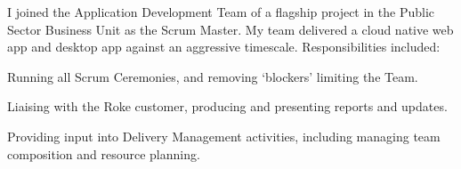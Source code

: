 I joined the Application Development Team of a flagship project in the Public Sector Business Unit as the Scrum Master.
My team delivered a cloud native web app and desktop app against an aggressive timescale.
Responsibilities included:
\vspace{0.25em}
\begin{tightemize}
  \item Running all Scrum Ceremonies, and removing `blockers' limiting the Team.
  \item Liaising with the Roke customer, producing and presenting reports and updates.
  \item Providing input into Delivery Management activities, including managing team composition and resource planning.
\end{tightemize}
\sectionsep{}
